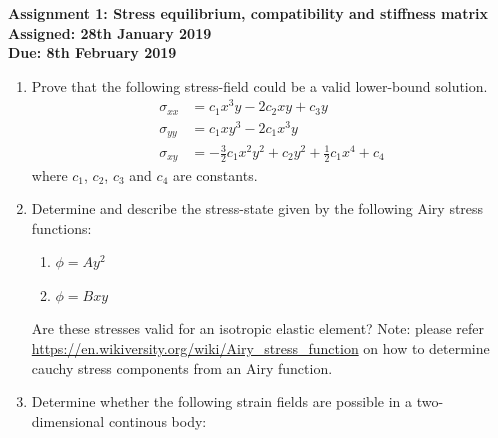 \documentclass[a4paper,12pt]{article}
\begin{document}
\begin{centering}
	\textbf{
		Assignment 1: Stress equilibrium, compatibility and stiffness matrix\\
		Assigned: 28th January 2019\\
		Due: 8th February 2019\\
	}
\end{centering}

\vspace{1em}
 
\begin{enumerate}
	\item Prove that the following stress-field could be a valid lower-bound solution.
	\begin{align*}
		\sigma_{xx} & = c_1 x^3 y - 2c_2 xy + c_3 y\\
		\sigma_{yy} & = c_1 x y^3 - 2c_1 x^3 y\\
		\sigma_{xy} & = -\frac{3}{2}c_1x^2y^2 + c_2 y^2 + \frac{1}{2}c_1 x^4 + c_4
	\end{align*}
	where $c_1$, $c_2$, $c_3$ and $c_4$ are constants.

	\item Determine and describe the stress-state given by the following Airy stress functions:
	\begin{enumerate}
		\item $\phi = Ay^2$ 
		\item $\phi = Bxy$
	\end{enumerate}
	Are these stresses valid for an isotropic elastic element? Note: please refer \url{https://en.wikiversity.org/wiki/Airy_stress_function} on how to determine cauchy stress components from an Airy function.

	\item Determine whether the following strain fields are possible in a two-dimensional continous body:
	

\end{enumerate}
\end{document}
